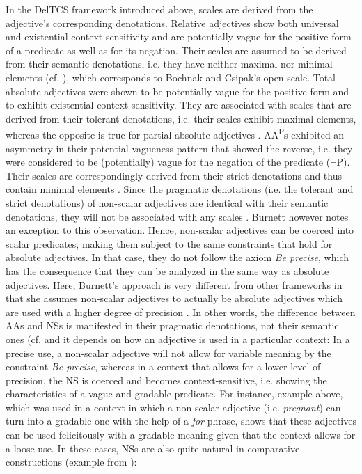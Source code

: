 \documentclass[output=paper]{langsci/langscibook}
\begin{document}
In the DelTCS framework introduced above, scales are derived from the adjective's corresponding denotations. Relative adjectives show both universal and existential context-sensitivity and are potentially vague for the positive form of a predicate as well as for its negation. Their scales are assumed to be derived from their semantic denotations, i.e. they have neither maximal nor minimal elements (cf. \citealt[90, 107]{Burnett2017}), which corresponds to Bochnak and Csipak's open scale. Total absolute adjectives were shown to be potentially vague for the positive form and to exhibit existential context-sensitivity. They are associated with scales that are derived from their tolerant denotations, i.e. their scales exhibit maximal elements, whereas the opposite is true for partial absolute adjectives \citeyearpar[90, 106]{Burnett2017}. AA\textsuperscript{P}s exhibited an asymmetry in their potential vagueness pattern that showed the reverse, i.e. they were considered to be (potentially) vague for the negation of the predicate ($\neg$P). Their scales are correspondingly derived from their strict denotations and thus contain minimal elements \citeyearpar[90, 106]{Burnett2017}. Since the pragmatic denotations (i.e. the tolerant and strict denotations) of non-scalar adjectives are identical with their semantic denotations, they will not be associated with any scales \citet[90]{Burnett2017}. Burnett however notes an exception to this observation. Hence, non-scalar adjectives can be coerced into scalar predicates, making them subject to the same constraints that hold for absolute adjectives. In that case, they do not follow the axiom \textit{Be precise}, which has the consequence that they can be analyzed in the same way as absolute adjectives. Here, Burnett's approach is very different from other frameworks in that she assumes non-scalar adjectives to actually be absolute adjectives which are used with a higher degree of precision \citeyearpar[97--98]{Burnett2017}. In other words, the difference between AAs and NSs is manifested in their pragmatic denotations, not their semantic ones (cf. \textcite[98]{Burnett2017} and it depends on how an adjective is used in a particular context: In a precise use, a non-scalar adjective will not allow for variable meaning by the constraint \textit{Be precise}, whereas in a context that allows for a lower level of precision, the NS is coerced and becomes context-sensitive, i.e. showing the characteristics of a vague and gradable predicate. For instance, example  above, which was used in a context in which a non-scalar adjective (i.e. \textit{pregnant}) can turn into a gradable one with the help of a \textit{for} phrase, shows that these adjectives can be used felicitously with a gradable meaning given that the context allows for a loose use. In these cases, NSs are also quite natural in comparative constructions (example from \citealt[96]{Burnett2017}):
\end{document}
